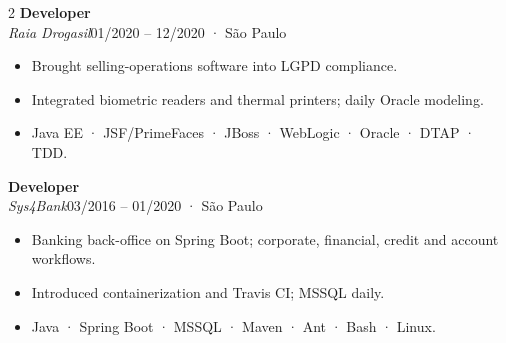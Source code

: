 \documentclass[10pt,a4paper]{article}
\newcommand{\role}[4]{\textbf{#1}\\\textit{\color{muted}#2}\hfill\small\color{muted}#3 · #4\par\smallskip}
\begin{document}
\begin{paracol}{2}
\role{Developer}{Raia Drogasil}{01/2020 -- 12/2020}{São Paulo}
\begin{itemize}
\item Brought selling-operations software into LGPD compliance.
\item Integrated biometric readers and thermal printers; daily Oracle modeling.
\item Java EE · JSF/PrimeFaces · JBoss · WebLogic · Oracle · DTAP · TDD.
\end{itemize}\smallskip

\role{Developer}{Sys4Bank}{03/2016 -- 01/2020}{São Paulo}
\begin{itemize}
\item Banking back-office on Spring Boot; corporate, financial, credit and account workflows.
\item Introduced containerization and Travis CI; MSSQL daily.
\item Java · Spring Boot · MSSQL · Maven · Ant · Bash · Linux.
\end{itemize}

\end{paracol}
\end{document}
